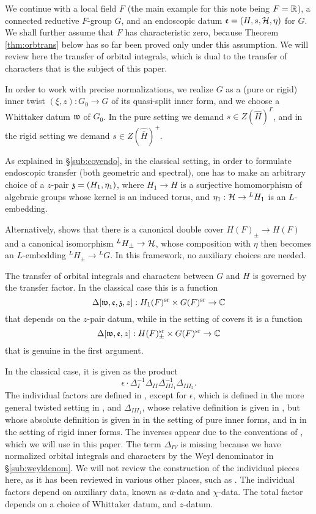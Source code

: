 \documentclass{article}
\theoremstyle{definition}
\numberwithin{equation}{section}
\renewcommand{\-}{\hyp{}}
\begin{document}
We continue with a local field $F$ (the main example for this note being $F=\mathbb{R}$), a connected reductive $F$-group $G$, and an endoscopic datum $\mathfrak{e}=(H,s,\mathcal{H},\eta)$ for $G$. We shall further assume that $F$ has characteristic zero, because Theorem \ref{thm:orbtrans} below has so far been proved only under this assumption. We will review here the transfer of orbital integrals, which is dual to the transfer of characters that is the subject of this paper.

	In order to work with precise normalizations, we realize $G$ as a (pure or rigid) inner twist $(\xi,z) : G_0 \to G$ of its quasi-split inner form, and we choose a Whittaker datum $\mathfrak{w}$ of $G_0$. In the pure setting we demand $s \in Z(\hat H)^\Gamma$, and in the rigid setting we demand $s \in Z(\hat{\bar H})^+$. 

As explained in \S\ref{sub:covendo}, in the classical setting, in order to formulate endoscopic transfer (both geometric and spectral), one has to make an arbitrary choice of a $z$-pair $\mathfrak{z}=(H_1,\eta_1)$, where $H_1 \to H$ is a surjective homomorphism of algebraic groups whose kernel is an induced torus, and $\eta_1 : \mathcal{H} \to {^LH_1}$ is an $L$\-embedding. 

Alternatively, \cite{KalHDC} shows that there is a canonical double cover $H(F)_\pm \to H(F)$ and a canonical isomorphism $^LH_\pm \to \mathcal{H}$, whose composition with $\eta$ then becomes an $L$\-embedding $^LH_\pm \to {^LG}$. In this framework, no auxiliary choices are needed.

The transfer of orbital integrals and characters between $G$ and $H$ is governed by the transfer factor. In the classical case this is a function
\[ \Delta[\mathfrak{w},\mathfrak{e},\mathfrak{z},z] : H_1(F)^{\textrm{sr}} \times G(F)^{\textrm{sr}} \to \mathbb{C} \]
that depends on the $z$-pair datum, while in the setting of covers it is a function
\[ \Delta[\mathfrak{w},\mathfrak{e},z] : H(F)_\pm^{\textrm{sr}} \times G(F)^{\textrm{sr}} \to \mathbb{C} \]
that is genuine in the first argument. 

In the classical case, it is given as the product
\[ \epsilon \cdot \Delta_I^{-1}\Delta_{II}\Delta_{III_1}^{-1}\Delta_{III_2}. \]
The individual factors are defined in \cite{LS87}, except for $\epsilon$, which is defined in the more general twisted setting in \cite[\S5.3]{KS99}, and $\Delta_{III_1}$, whose relative definition is given in \cite{LS87}, but whose absolute definition is given in \cite{KalECI} in the setting of pure inner forms, and in \cite{KalRI} in the setting of rigid inner forms. The inverses appear due to the conventions of \cite[(1.0.4)]{KS12}, which we will use in this paper. The term $\Delta_{IV}$ is missing because we have normalized orbital integrals and characters by the Weyl denominator in \S\ref{sub:weyldenom}. We will not review the construction of the individual pieces here, as it has been reviewed in various other places, such as \cite[\S3.5,\S4.2,\S4.3]{KalIMS}. The individual factors depend on auxiliary data, known as $a$-data and $\chi$-data. The total factor depends on a choice of Whittaker datum, and $z$-datum.
\end{document}
